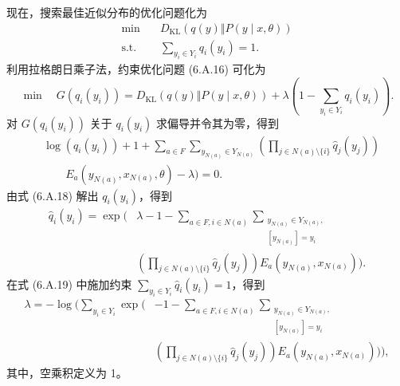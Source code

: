 现在，搜索最佳近似分布的优化问题化为
\begin{equation}
\begin{aligned}
\min\quad&D_{\mathrm{KL}}(q(y)\Vert P(y\mid x,\theta))\\
\text{s.t.}\quad&\sum_{y_i\in Y_i}q_i(y_i)=1.
\end{aligned}\tag{6.A.16}
\end{equation}
利用拉格朗日乘子法，约束优化问题 (6.A.16) 可化为
\begin{equation}
\min\quad G(q_i(y_i))=D_{\mathrm{KL}}(q(y)\Vert P(y\mid x,\theta))+\lambda\left(1-\sum_{y_i\in Y_i}q_i(y_i)\right).
\tag{6.A.17}
\end{equation}
对 $G(q_i(y_i))$ 关于 $q_i(y_i)$ 求偏导并令其为零，得到
\begin{equation}
\begin{aligned}
&\log(q_i(y_i))+1+\sum_{a\in F}\sum_{y_{N(a)}\in Y_{N(a)}}\left(\prod_{j\in N(a)\setminus\{i\}}\widehat q_j(y_j)\right)\\
&\qquad E_a(y_{N(a)},x_{N(a)},\theta)-\lambda)=0.
\end{aligned}\tag{6.A.18}
\end{equation}
由式 (6.A.18) 解出 $q_i(y_i)$，得到
\begin{equation}
\begin{aligned}
\widehat q_i(y_i)=\exp\Biggl(&\lambda-1-\sum_{a\in F,i\in N(a)}\sum_{\substack{y_{N(a)}\in Y_{N(a)},\\{}[y_{N(a)}]=y_i}}\\
&\left(\prod_{j\in N(a)\setminus\{i\}}\widehat q_j(y_j)\right)E_a(y_{N(a)},x_{N(a)})\Biggr).
\end{aligned}\tag{6.A.19}
\end{equation}
在式 (6.A.19) 中施加约束 $\sum_{y_i\in Y_i}\widehat q_i(y_i)=1$，得到
\begin{equation}
\begin{aligned}
\lambda=-\log\Biggl(\sum_{y_i\in Y_i}\exp\Biggl(&-1-\sum_{a\in F,i\in N(a)}\sum_{\substack{y_{N(a)}\in Y_{N(a)},\\{}[y_{N(a)}]=y_i}}\\
&\left(\prod_{j\in N(a)\setminus\{i\}}\widehat q_j(y_j)\right)E_a(y_{N(a)},x_{N(a)})\Biggr)\Biggr),
\end{aligned}\tag{6.A.20}
\end{equation}
其中，空乘积定义为 1。
